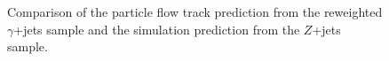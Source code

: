 \begin{figure}[!htbp]
\begin{center}
\caption{Comparison of the particle flow track \met prediction from the reweighted $\gamma$+jets sample
and the simulation prediction from the $Z$+jets sample.}
\label{fig:PhotonJetsClosureTest_TrackMET}
\end{center}
\end{figure}

